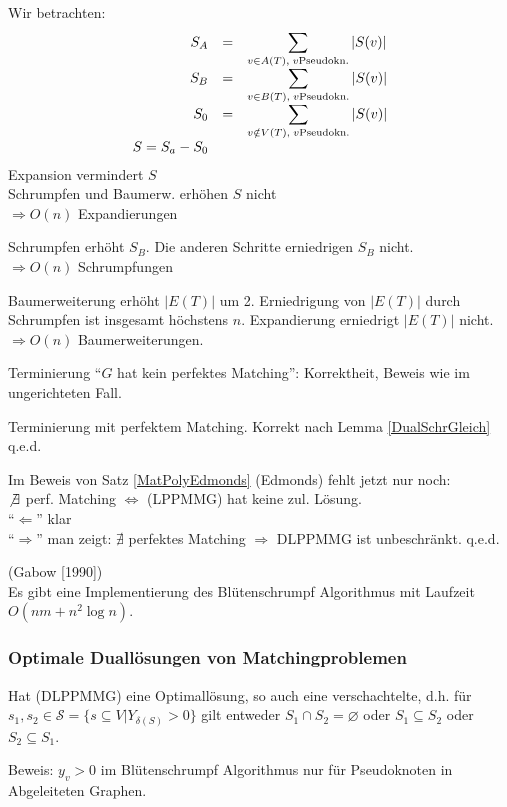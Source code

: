 Wir betrachten:
\[\begin{array}{rcl}
S_A &=& \displaystyle \sum_{v \in A(T),\; v \mbox{\scriptsize
 Pseudokn.}}|S(v)|\\
S_B &=& \displaystyle \sum_{v \in B(T), \; v \mbox{\scriptsize
 Pseudokn.}}|S(v)|\\
S_0 &=& \displaystyle \sum_{v \notin V(T), \; v \mbox{\scriptsize
 Pseudokn.}}|S(v)|\\
S=S_a - S_0
\end{array}\]
Expansion vermindert $S$\\
Schrumpfen und Baumerw. erhöhen $S$ nicht\\
$\Rightarrow O(n)$ Expandierungen

Schrumpfen erhöht $S_B$. Die anderen Schritte erniedrigen $S_B$ nicht.\\
$\Rightarrow O(n)$ Schrumpfungen

Baumerweiterung erhöht $|E(T)|$ um 2. Erniedrigung von $|E(T)|$ durch
Schrumpfen ist insgesamt höchstens $n$. Expandierung erniedrigt
$|E(T)|$ nicht.\\
$\Rightarrow O(n)$ Baumerweiterungen.

Terminierung "`$G$ hat kein perfektes Matching"': Korrektheit, Beweis wie
im ungerichteten Fall.

Terminierung mit perfektem Matching. Korrekt nach Lemma \ref{DualSchrGleich}
q.e.d.

Im Beweis von Satz \ref{MatPolyEdmonds} (Edmonds) fehlt jetzt nur noch:\\
$\not\exists$ perf. Matching $\Leftrightarrow$ (LPPMMG) hat keine zul.
Lösung.\\
"`$\Leftarrow$"' klar\\
"`$\Rightarrow$"' man zeigt: $\nexists$ perfektes Matching $\Rightarrow$
DLPPMMG ist unbeschränkt. q.e.d.

\begin{satz}
(Gabow [1990])\\
Es gibt eine Implementierung des Blütenschrumpf Algorithmus mit Laufzeit
$O(n m + n^2 \log n)$.
\end{satz}

\subsubsection{Optimale Duallösungen von Matchingproblemen}

\begin{satz}
Hat (DLPPMMG) eine Optimallösung, so auch eine verschachtelte, d.h. für
$s_1, s_2 \in \mathscr{S} = \{s \subseteq V| Y_{\delta(S)} > 0\}$ gilt
entweder $S_1 \cap S_2 = \varnothing$ oder $S_1 \subseteq S_2$ oder $S_2
\subseteq S_1$.\\
\end{satz}
Beweis: $y_v>0$ im Blütenschrumpf Algorithmus nur für Pseudoknoten in
Abgeleiteten Graphen.

